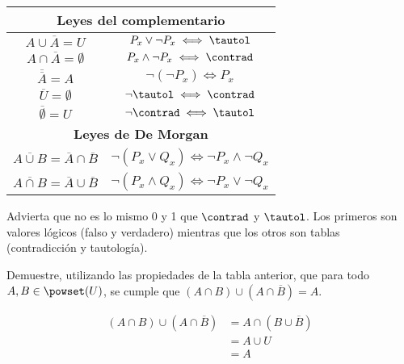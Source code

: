 \begin{table}
\begin{tabular}{|c|c|}
    \hline

    \multicolumn{2}{|c|}{\textbf{Leyes del complementario}} \\
    \hline
    $A \cup \overline{A} = U$ & $P_x \lor \neg P_x \iff \tautol$ \\
    $A \cap \overline{A} = \emptyset$ & $P_x \land \neg P_x \iff \contrad$ \\
    $\overline{\overline{A}} = A$ & $\neg (\neg P_x) \iff P_x$ \\
    $\overline{U} = \emptyset$ & $\neg \tautol \iff \contrad$ \\
    $\overline{\emptyset} = U$ & $\neg \contrad \iff \tautol$ \\

    \hline

    \multicolumn{2}{|c|}{\textbf{Leyes de De Morgan}} \\
    \hline
    $\overline{A \cup B} = \overline{A} \cap \overline{B}$ & $\neg (P_x \lor
      Q_x) \iff \neg P_x \land \neg Q_x$ \\
    $\overline{A \cap B} = \overline{A} \cup \overline{B}$ & $\neg (P_x
      \land Q_x) \iff \neg P_x \lor \neg Q_x$ \\

    \hline
  \end{tabular}
\end{table}

Advierta que no es lo mismo 0 y 1 que $\contrad$ y $\tautol$. Los primeros
son valores lógicos (falso y verdadero) mientras que los otros son tablas
(contradicción y tautología).

\begin{exercise}
  Demuestre, utilizando las propiedades de la tabla anterior, que para todo
  $A, B \in \powset(U)$, se cumple que $(A \cap B) \cup (A \cap
  \overline{B}) = A$.

  \begin{align*}
    (A \cap B) \cup (A \cap \overline{B})
      &= A \cap (B \cup \overline{B}) \\
      &= A \cup U \\
      &= A
  \end{align*}
\end{exercise}







